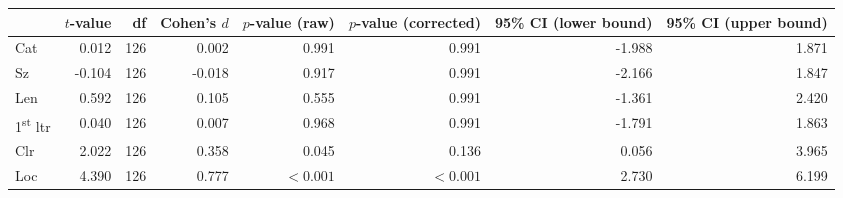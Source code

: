 \begin{tabular}{lrrrrrrr}
\toprule
{} & $t$-value &  df & Cohen's $d$ & $p$-value (raw) & $p$-value (corrected) & 95\% CI (lower bound) & 95\% CI (upper bound) \\
\midrule
Cat                       &     0.012 & 126 &       0.002 &           0.991 &                 0.991 &                -1.988 &                 1.871 \\
Sz                        &    -0.104 & 126 &      -0.018 &           0.917 &                 0.991 &                -2.166 &                 1.847 \\
Len                       &     0.592 & 126 &       0.105 &           0.555 &                 0.991 &                -1.361 &                 2.420 \\
1\textsuperscript{st} ltr &     0.040 & 126 &       0.007 &           0.968 &                 0.991 &                -1.791 &                 1.863 \\
Clr                       &     2.022 & 126 &       0.358 &           0.045 &                 0.136 &                 0.056 &                 3.965 \\
Loc                       &     4.390 & 126 &       0.777 &       $< 0.001$ &             $< 0.001$ &                 2.730 &                 6.199 \\
\bottomrule
\end{tabular}
